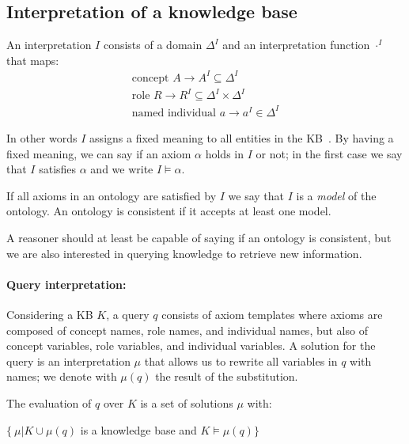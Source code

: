 \subsection{Interpretation of a knowledge base}
An interpretation $\mathit{I}$ consists of a domain $\Delta^\mathit{I}$ and an interpretation function $\cdot^\mathit{I}$ that maps:
\begin{gather*}
	\text{concept } A \rightarrow A^\mathit{I} \subseteq \Delta^\mathit{I}\\
	\text{role } R \rightarrow R^\mathit{I} \subseteq \Delta^\mathit{I} \times \Delta^\mathit{I}\\
	\text{named individual } a \rightarrow a^\mathit{I} \in \Delta^\mathit{I}
\end{gather*}

In other words $\mathit{I}$ assigns a fixed meaning to all entities in the KB~\cite{krotzsch2012description}. By having a fixed meaning, we can say if an axiom $\alpha$ holds in $\mathit{I}$ or not; in the first case we say that $\mathit{I}$ satisfies $\alpha$ and we write $\mathit{I} \models \alpha$. 

If all axioms in an ontology are satisfied by $\mathit{I}$ we say that $\mathit{I}$ is a \emph{model} of the ontology. An ontology is consistent if it accepts at least one model.

A reasoner should at least be capable of saying if an ontology is consistent, but we are also interested in querying knowledge to retrieve new information.

\paragraph{Query interpretation:} Considering a KB $\mathit{K}$, a query $q$ consists of axiom templates where  axioms are composed of concept names, role names, and individual names, but also of concept variables, role variables, and individual variables. A solution for the query is an interpretation $\mu$ that allows us to rewrite all variables in $q$ with names; we denote with $\mu(q)$ the result of the substitution. 

The evaluation of $q$ over $\mathit{K}$ is a set of solutions $\mu$ with:~\cite{kollia2011query}

\begin{center}
	$\{\ \mu | \mathit{K} \cup \mu(q)$ is a  knowledge base and $\mathit{K} \models \mu(q) \}$
\end{center}

